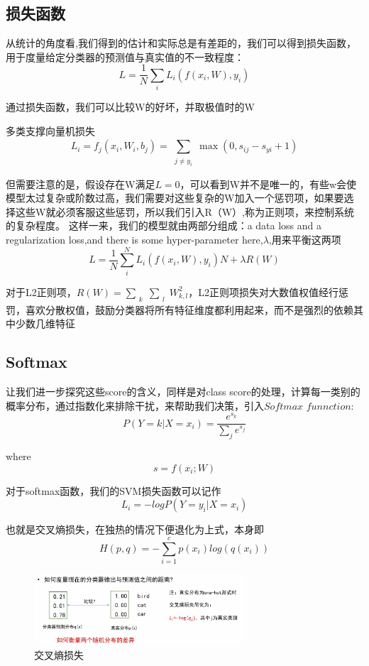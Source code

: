 \documentclass[12pt]{article}
\begin{document}
\subsection{损失函数}
从统计的角度看,我们得到的估计和实际总是有差距的，我们可以得到损失函数，用于度量给定分类器的预测值与真实值的不一致程度：
\\$$ L=\frac{1}{N} \sum_{i}{} L_i(f(x_i,W),y_i)  $$

通过损失函数，我们可以比较W的好坏，并取极值时的W

多类支撑向量机损失
\\$$ L_i=f_j(x_i,W_i,b_j)=\sum_{\substack{j \ne y_i}}^{} \max(0,s_{ij}-s_{yi}+1)       $$

但需要注意的是，假设存在W满足$L=0$，可以看到W并不是唯一的，有些w会使模型太过复杂或阶数过高，我们需要对这些复杂的W加入一个惩罚项，如果要选择这些W就必须客服这些惩罚，所以我们引入R（W）,称为正则项，来控制系统的复杂程度。
这样一来，我们的模型就由两部分组成：a data loss and a regularization loss,and there is some hyper-parameter here,$\lambda$,用来平衡这两项
\\$$ L=\frac{1}{N} \sum_{i}^{N} L_i(f(x_i,W),y_i)N+\lambda R(W)  $$

对于L2正则项，$R(W)=\sum_{\substack{k}}\sum_{\substack{l}}W_{k,l}^2$，L2正则项损失对大数值权值经行惩罚，喜欢分散权值，鼓励分类器将所有特征维度都利用起来，而不是强烈的依赖其中少数几维特征

\subsection{Softmax}
让我们进一步探究这些score的含义，同样是对class score的处理，计算每一类别的概率分布，通过指数化来排除干扰，来帮助我们决策，引入\(Softmax\)  \(funnction\):
\\$$P(Y=k|X=x_i)=\frac{e^{s_k}}{\sum_{j}e^{s_j}}$$ 

where 
$$s=f(x_i;W)$$

对于softmax函数，我们的SVM损失函数可以记作
\\$$L_i=-logP(Y=y_i|X=x_i)$$

也就是交叉熵损失，在独热的情况下便退化为上式，本身即
\\$$H(p,q) = -\sum_{i=1}^{c}p(x_i)log(q(x_i)) $$
\begin{figure}[ht]  %
\centering
\includegraphics[width=0.7\textwidth]{pic21.png}
\caption{交叉熵损失} 
\end{figure}
\end{document}
